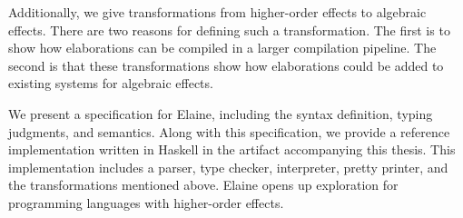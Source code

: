 Additionally, we give transformations from higher-order effects to algebraic effects. There are two reasons for defining such a transformation. The first is to show how elaborations can be compiled in a larger compilation pipeline. The second is that these transformations show how elaborations could be added to existing systems for algebraic effects.

We present a specification for Elaine, including the syntax definition, typing judgments, and semantics. Along with this specification, we provide a reference implementation written in Haskell in the artifact accompanying this thesis. This implementation includes a parser, type checker, interpreter, pretty printer, and the transformations mentioned above. Elaine opens up exploration for programming languages with higher-order effects.

